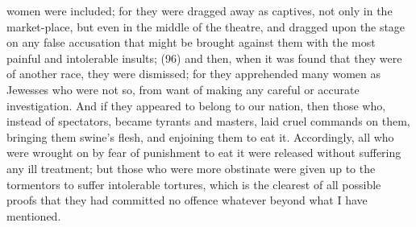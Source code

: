 women were included; for they were dragged away as captives, not only in the market-place, but
even in the middle of the theatre, and dragged upon the stage on any false accusation that might
be brought against them with the most painful and intolerable insults; (96) and then, when it was
found that they were of another race, they were dismissed; for they apprehended many women as
Jewesses who were not so, from want of making any careful or accurate investigation. And if they
appeared to belong to our nation, then those who, instead of spectators, became tyrants and
masters, laid cruel commands on them, bringing them swine's flesh, and enjoining them to eat it.
Accordingly, all who were wrought on by fear of punishment to eat it were released without
suffering any ill treatment; but those who were more obstinate were given up to the tormentors to
suffer intolerable tortures, which is the clearest of all possible proofs that they had committed no
offence whatever beyond what I have mentioned.

